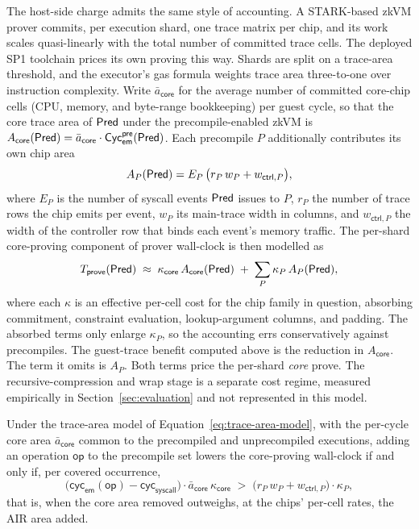 The host-side charge admits the same style of accounting. A STARK-based zkVM prover commits, per execution shard, one trace matrix per chip, and its work scales quasi-linearly with the total number of committed trace cells. The deployed SP1 toolchain prices its own proving this way. Shards are split on a trace-area threshold, and the executor's gas formula weights trace area three-to-one over instruction complexity. Write $\bar a_{\mathsf{core}}$ for the average number of committed core-chip cells (CPU, memory, and byte-range bookkeeping) per guest cycle, so that the core trace area of $\mathsf{Pred}$ under the precompile-enabled zkVM is $A_{\mathsf{core}}(\mathsf{Pred}) = \bar a_{\mathsf{core}}\cdot\mathsf{Cyc}_{\mathsf{em}}^{\mathsf{pre}}(\mathsf{Pred})$. Each precompile $P$ additionally contributes its own chip area
\begin{equation*}
  A_P(\mathsf{Pred}) = E_P\,\bigl(r_P\,w_P + w_{\mathsf{ctrl},P}\bigr),
\end{equation*}
where $E_P$ is the number of syscall events $\mathsf{Pred}$ issues to $P$, $r_P$ the number of trace rows the chip emits per event, $w_P$ its main-trace width in columns, and $w_{\mathsf{ctrl},P}$ the width of the controller row that binds each event's memory traffic. The per-shard core-proving component of prover wall-clock is then modelled as
\begin{equation}\label{eq:trace-area-model}
  T_{\mathsf{prove}}(\mathsf{Pred})
  \;\approx\;
  \kappa_{\mathsf{core}}\,A_{\mathsf{core}}(\mathsf{Pred})
  \;+\;
  \sum_{P}\kappa_P\,A_P(\mathsf{Pred}),
\end{equation}
where each $\kappa$ is an effective per-cell cost for the chip family in question, absorbing commitment, constraint evaluation, lookup-argument columns, and padding. The absorbed terms only enlarge $\kappa_P$, so the accounting errs conservatively against precompiles. The guest-trace benefit computed above is the reduction in $A_{\mathsf{core}}$. The term it omits is $A_P$. Both terms price the per-shard \emph{core} prove. The recursive-compression and wrap stage is a separate cost regime, measured empirically in Section~\ref{sec:evaluation} and not represented in this model. \begin{proposition}\label{prop:precompile-pays}
Under the trace-area model of Equation~\eqref{eq:trace-area-model}, with the per-cycle core area $\bar a_{\mathsf{core}}$ common to the precompiled and unprecompiled executions, adding an operation $\mathsf{op}$ to the precompile set lowers the core-proving wall-clock if and only if, per covered occurrence,
\begin{equation}\label{eq:precompile-pays}
  \bigl(\mathsf{cyc}_{\mathsf{em}}(\mathsf{op}) - \mathsf{cyc}_{\mathsf{syscall}}\bigr)\cdot \bar a_{\mathsf{core}}\,\kappa_{\mathsf{core}}
  \;>\;
  \bigl(r_P\,w_P + w_{\mathsf{ctrl},P}\bigr)\cdot \kappa_P,
\end{equation}
that is, when the core area removed outweighs, at the chips' per-cell rates, the AIR area added.
\end{proposition}
